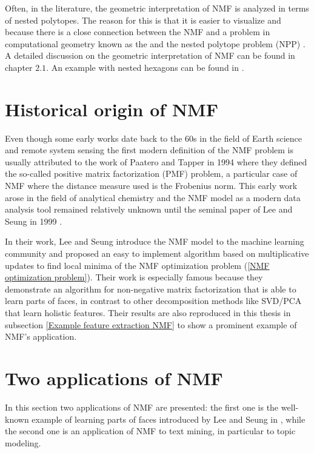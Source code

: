 Often, in the literature, the geometric interpretation of NMF is analyzed in terms of nested polytopes.
The reason for this is that it is easier to visualize and because there is a close connection between the NMF and a problem in computational geometry known as the and the nested polytope problem (NPP)  \cite{donoho2003does}.
A detailed discussion on the geometric interpretation of NMF can be found in \cite{gillis2020nonnegative} chapter $2.1$.
An example with nested hexagons can be found in \cite{gillis2017introductionnonnegativematrixfactorization}.

\section{Historical origin of NMF}
Even though some early works date back to the 60s in the field of Earth science and remote system sensing \cite{wallace1960analysis}\cite{imbrie1964vector}\cite{craig2002minimum}
the first modern definition of the NMF problem is usually attributed to the work of Paatero and Tapper in 1994 \cite{paatero1994positive} where they defined the so-called positive matrix factorization (PMF) problem, a particular case of NMF where the distance measure used is the Frobenius norm.
This early work arose in the field of analytical chemistry and the NMF model as a modern data analysis tool remained relatively unknown until the seminal paper of Lee and Seung in 1999 \cite{Lee1999}.
\par
In their work, Lee and Seung introduce the NMF model to the machine learning community and proposed an easy to implement algorithm based on multiplicative updates to find local minima of the NMF optimization problem (\ref{NMF optimization problem}).
Their work is especially famous because they  demonstrate an algorithm for non-negative matrix factorization that is able to learn parts of faces, in contrast to other decomposition methods like SVD/PCA that learn holistic features. Their results are also reproduced in this thesis in subsection \ref{Example feature extraction NMF} to show a prominent example of NMF's application.
\section{Two applications of NMF}\label{two applications of NMF section}
In this section two applications of NMF are presented: the first one is the well-known example of learning parts of faces introduced by Lee and Seung in \cite{Lee1999},
while the second one is an application of NMF to text mining, in particular to topic modeling.
